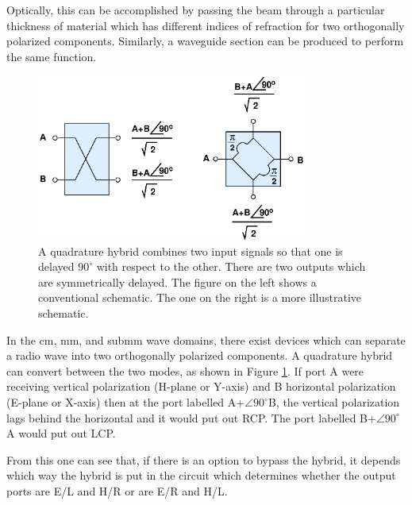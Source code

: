 \documentclass[letterpaper,11pt]{book}
\begin{document}
Optically, this can be accomplished
by passing the beam through a particular thickness of material which
has different indices of refraction for two orthogonally polarized
components. Similarly, a waveguide section can be produced to perform the
same function.

\begin{figure}[h!tb]
\begin{center}
\includegraphics[width=3.5in]{quad_hybrid.eps}
\caption[Quadrature hybrid]{\label{fig:quad-hybrid}A quadrature hybrid
combines two input signals so that one is delayed $90^{\circ}$
with respect to the other. There are two outputs which are
symmetrically delayed.  The figure on the left shows a
conventional schematic.  The one on the right is a more
illustrative schematic.}
\end{center}
\end{figure}
In the cm, mm, and submm wave domains, there exist devices which can
separate a radio wave into two orthogonally polarized components.
A quadrature hybrid can convert between the two modes, as shown in
Figure \ref{fig:quad-hybrid}. If port A were receiving
vertical polarization (H-plane or Y-axis) and B horizontal polarization 
(E-plane or X-axis) then at the port labelled A+$\angle 90^{\circ}$B, the
vertical polarization lags behind the horizontal and it would put out RCP.
The port labelled B+$\angle 90^{\circ}$A would put out LCP.

From this one can see that, if there is an option to bypass the hybrid, it 
depends which way the hybrid is put in the 
circuit which determines whether the output ports are E/L and H/R or are
E/R and H/L.



\clearpage

\printindex
\end{document}
